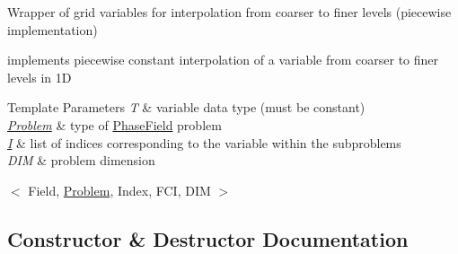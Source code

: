 Wrapper of grid variables for interpolation from coarser to finer levels (piecewise implementation) 

implements piecewise constant interpolation of a variable from coarser to finer levels in 1D


\begin{DoxyTemplParams}{Template Parameters}
{\em T} & variable data type (must be constant) \\
\hline
{\em \hyperlink{classUintah_1_1PhaseField_1_1Problem}{Problem}} & type of \hyperlink{namespaceUintah_1_1PhaseField}{Phase\+Field} problem \\
\hline
{\em \hyperlink{structUintah_1_1PhaseField_1_1I}{I}} & list of indices corresponding to the variable within the subproblems \\
\hline
{\em D\+IM} & problem dimension\\
\hline
\end{DoxyTemplParams}
$<$ Field, \hyperlink{classUintah_1_1PhaseField_1_1Problem}{Problem}, Index, F\+CI, D\+IM $>$ 

\subsection{Constructor \& Destructor Documentation}
\mbox{\label{classUintah_1_1PhaseField_1_1detail_1_1amr__interpolator_3_01ScalarField_3_01T_01_4_00_01Problem64f2458f98b03e27672a091eecc4b696_a2ac98ad421a41cc7a2780cb09a95539f}} 
